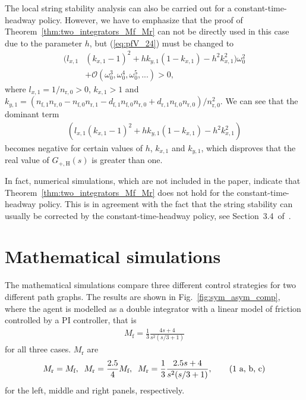 \documentclass[10pt,twocolumn,twoside]{IEEEtran}
\theoremstyle{definition}
\begin{document}
{The local string stability analysis can also be carried out for a constant-time-headway policy. However, we have to emphasize that the proof of Theorem~\ref{thm:two_integrators_Mf_Mr} can not be directly used in this case due to the parameter $h$, but (\ref{eq:pfV_24}) must be changed to
\begin{align}
  (l_{x,1} &(k_{x,1}-1)^2 + hk_{y,1}(1-k_{x,1})-h^2k_{x,1}^2) \omega_0^2 \nonumber\\
  &+ \mathcal{O}(\omega_0^3, \omega_0^4, \omega_0^5, ...) > 0,
\end{align}
where $l_{x,1} = 1/n_{\text{r},0} > 0$, $k_{x,1} > 1$ and $k_{y,1} = (n_{\text{f},1}n_{\text{r},0} - n_{\text{f},0}n_{\text{r},1} - d_{\text{f},1}n_{\text{f},0}n_{\text{r},0} + d_{\text{r},1}n_{\text{f},0}n_{\text{r},0})/n_{\text{r},0}^2$. We can see that the dominant term
\begin{align}
  \left(l_{x,1} (k_{x,1}-1)^2 + hk_{y,1}(1-k_{x,1})-h^2k_{x,1}^2\right)
\end{align}
becomes negative for certain values of $h$, $k_{x,1}$ and $k_{y,1}$, which disproves that the real value of $G_{+,\text{H}}(s)$ is greater than one.

In fact, numerical simulations, which are not included in the paper, indicate that Theorem~\ref{thm:two_integrators_Mf_Mr} does not hold for the constant-time-headway policy. This is in agreement with the fact that the string stability can usually be corrected by the constant-time-headway policy, see Section~3.4~of~\cite{Eyre1998a}.
}

\section{Mathematical simulations}\label{sec:simulations}




The mathematical simulations compare three different control strategies for two different path graphs. The results are shown in Fig.~\ref{fig:sym_asym_comp}, where the agent is modelled as a double integrator with a linear model of friction controlled by a PI controller, that is
\begin{align}
  M_{\text{f}} = \frac{1}{3}\frac{4s+4}{s^2(s/3+1)}\label{eq:mat_sim_1}
\end{align}
for all three cases. $M_{\text{r}}$ are
\begin{align}
\addtocounter{equation}{1}
  M_{\text{r}} = M_{\text{f}},\;\;
  M_{\text{r}} = \frac{2.5}{4}M_{\text{f}},\;\;
  M_{\text{r}} = \frac{1}{3} \frac{2.5s+4}{s^2(s/3+1)},
  \tag{\arabic{equation} a, b, c}
  \label{eq:mat_sim_2}
\end{align}
for the left, middle and right panels, respectively.
\setcounter{multi_eq1}{\value{equation}}
\end{document}
